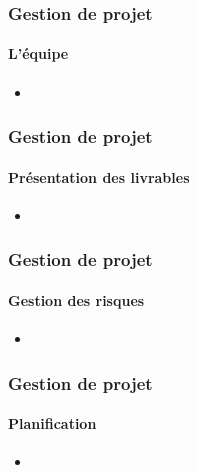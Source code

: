\begin{frame}
\frametitle{Gestion de projet}
\framesubtitle{L'équipe}
\begin{itemize}
\item 
\end{itemize}
\end{frame}


\begin{frame}
\frametitle{Gestion de projet}
\framesubtitle{Présentation des livrables}
\begin{itemize}
\item 
\end{itemize}
\end{frame}


\begin{frame}
\frametitle{Gestion de projet}
\framesubtitle{Gestion des risques}
\begin{itemize}
\item 
\end{itemize}
\end{frame}


\begin{frame}
\frametitle{Gestion de projet}
\framesubtitle{Planification}
\begin{itemize}
\item 
\end{itemize}
\end{frame}
